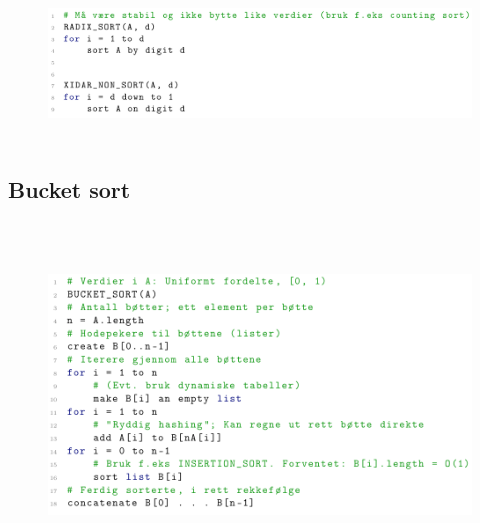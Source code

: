 \documentclass[12pt]{report}
\begin{document}
\begin{figure}[H]
	\begin{Center}
		\includegraphics[width=6.3in,height=1.64in]{./media/image175.png}
	\end{Center}
\end{figure}



\par


\vspace{\baselineskip}

\vspace{\baselineskip}

\vspace{\baselineskip}
\subsection*{Bucket sort}



\begin{figure}[H]
	\begin{Center}
		\includegraphics[width=6.3in,height=3.58in]{./media/image176.png}
	\end{Center}
\end{figure}
\end{document}

